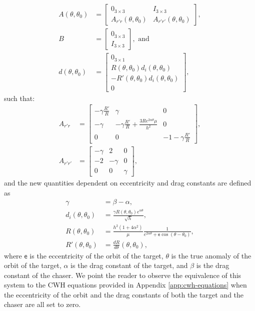 \begin{subequations}
\begin{align}
    A(\theta, \theta_0)&=\begin{bmatrix}
        0_{3\times3}&I_{3\times3}\\
        A_{r'r}(\theta, \theta_0)&A_{r'r'}(\theta, \theta_0)
    \end{bmatrix},\\
    B&=\begin{bmatrix}
        0_{3\times3}\\
        I_{3\times3}
    \end{bmatrix},\text{ and}\\
    d(\theta, \theta_0)&=\begin{bmatrix}
        0_{3\times1}\\
        R(\theta,\theta_0)d_i(\theta,\theta_0)\\
        -R'(\theta,\theta_0)d_i(\theta,\theta_0)\\
        0
    \end{bmatrix},
\end{align}
\end{subequations}
such that:
\begin{subequations}
\begin{align}
    A_{r'r}&=\begin{bmatrix}
        -\gamma\frac{R'}{R}&\gamma&0\\
        -\gamma&-\gamma\frac{R'}{R} + \frac{3Re^{2\alpha\theta}\mu}{h^2}&0\\
        0&0&-1-\gamma\frac{R'}{R}
    \end{bmatrix},\\
    A_{r'r'}&=\begin{bmatrix}
        -\gamma&2&0\\
        -2&-\gamma&0\\
        0&0&\gamma
    \end{bmatrix},
\end{align}
\end{subequations}
and the new quantities dependent on eccentricity and drag constants are defined as
\begin{subequations}
\begin{align}
    \gamma&= \beta - \alpha,\\
    d_i(\theta,\theta_0) &= \frac{\gamma R(\theta,\theta_0)e^{\alpha\theta}}{\sqrt{h}},\\
    R(\theta,\theta_0) &= \frac{h^2(1+4\alpha^2)}{\mu} \frac{1}{e^{2\alpha\theta} + {\mathsf{e}}\cos{(\theta - \theta_0)}},\\
    R'(\theta,\theta_0)&=\frac{dR}{d\theta}(\theta,\theta_0),
\end{align}
\end{subequations}
where ${\mathsf{e}}$ is the eccentricity of the orbit of the target, $\theta$ is the true anomaly of the orbit of the target, $\alpha$ is the drag constant of the target, and $\beta$ is the drag constant of the chaser.
We point the reader to observe the equivalence of this system to the CWH equations provided in Appendix \ref{app:cwh-equations} when the eccentricity of the orbit and the drag constants of both the target and the chaser are all set to zero.

